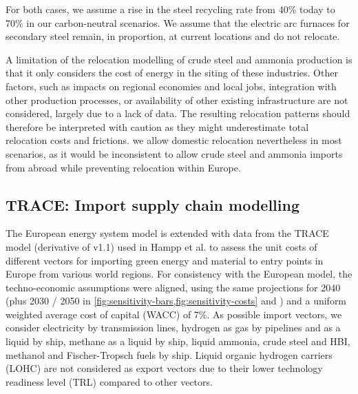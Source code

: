 For both cases, we assume a rise in the steel recycling rate from 40\% today to
70\% in our carbon-neutral
scenarios.\cite{materialeconomicsIndustrialTransformation20502019} We assume
that the electric arc furnaces for secondary steel remain, in proportion, at
current locations and do not relocate.

A limitation of the relocation modelling of crude steel and ammonia production
is that it only considers the cost of energy in the siting of these industries.
Other factors, such as impacts on regional economies and local jobs, integration
with other production processes, or availability of other existing infrastructure are
not considered, largely due to a lack of data. The resulting relocation patterns
should therefore be interpreted with caution as they might underestimate total
relocation costs and frictions. we allow domestic relocation nevertheless in
most scenarios, as it would be inconsistent to allow crude steel and ammonia
imports from abroad while preventing relocation within Europe.

\subsection*{TRACE: Import supply chain modelling}
\label{sec:methods-trace}

The European energy system model is extended with data from the TRACE model
(derivative of v1.1) used in Hampp et al.\cite{hamppImportOptions2023} to assess
the unit costs of different vectors for importing green energy and material to
entry points in Europe from various world regions. For consistency with the
European model, the techno-economic assumptions were aligned, using the same
projections for 2040 (plus 2030 / 2050 in
\cref{fig:sensitivity-bars,fig:sensitivity-costs} and )
and a uniform weighted average cost of capital (WACC) of
7\%.\cite{lonerganImprovingRepresentationCost2023} As possible import vectors,
we consider electricity by transmission lines, hydrogen as gas by pipelines and
as a liquid by ship, methane as a liquid by ship, liquid ammonia, crude steel and HBI,
methanol and Fischer-Tropsch fuels by ship. Liquid organic hydrogen carriers
(LOHC) are not considered as export vectors due to their lower technology
readiness level (TRL) compared to other
vectors.\cite{irenaGlobalHydrogenTrade2022}

